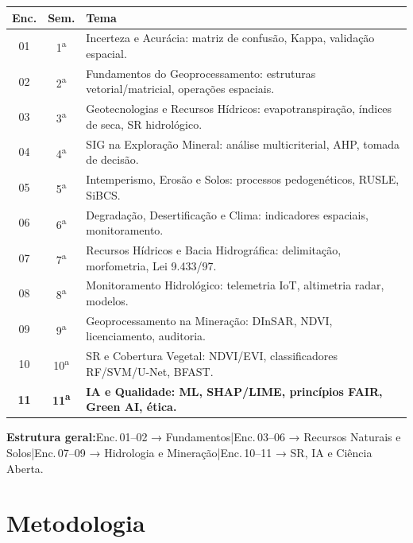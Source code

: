 \documentclass[11pt,a4paper]{article}
\begin{document}
\begin{small}
\renewcommand{\arraystretch}{1.35}
\begin{tabularx}{\textwidth}{@{}c c X@{}}
\toprule
\textbf{Enc.} & \textbf{Sem.} & \textbf{Tema} \\
\midrule
01 & 1\textsuperscript{a} & Incerteza e Acurácia: matriz de confusão, Kappa, validação espacial. \\
02 & 2\textsuperscript{a} & Fundamentos do Geoprocessamento: estruturas vetorial/matricial, operações espaciais. \\
03 & 3\textsuperscript{a} & Geotecnologias e Recursos Hídricos: evapotranspiração, índices de seca, SR hidrológico. \\
04 & 4\textsuperscript{a} & SIG na Exploração Mineral: análise multicriterial, AHP, tomada de decisão. \\
05 & 5\textsuperscript{a} & Intemperismo, Erosão e Solos: processos pedogenéticos, RUSLE, SiBCS. \\
06 & 6\textsuperscript{a} & Degradação, Desertificação e Clima: indicadores espaciais, monitoramento. \\
07 & 7\textsuperscript{a} & Recursos Hídricos e Bacia Hidrográfica: delimitação, morfometria, Lei 9.433/97. \\
08 & 8\textsuperscript{a} & Monitoramento Hidrológico: telemetria IoT, altimetria radar, modelos. \\
09 & 9\textsuperscript{a} & Geoprocessamento na Mineração: DInSAR, NDVI, licenciamento, auditoria. \\
10 & 10\textsuperscript{a} & SR e Cobertura Vegetal: NDVI/EVI, classificadores RF/SVM/U-Net, BFAST. \\
\rowcolor{uefslight!70!white}
\textbf{11} & \textbf{11\textsuperscript{a}} & \textbf{\textsf{IA e Qualidade}: ML, SHAP/LIME, princípios FAIR, Green AI, ética.} \\
\bottomrule
\end{tabularx}
\end{small}

\begin{tcolorbox}[uefsbox]
\textbf{Estrutura geral:}\enspace Enc.\,01--02 → Fundamentos\enspace|\enspace Enc.\,03--06 → Recursos Naturais e Solos\enspace|\enspace Enc.\,07--09 → Hidrologia e Mineração\enspace|\enspace Enc.\,10--11 → SR, IA e Ciência Aberta.
\end{tcolorbox}


\section*{Metodologia}
\end{document}
